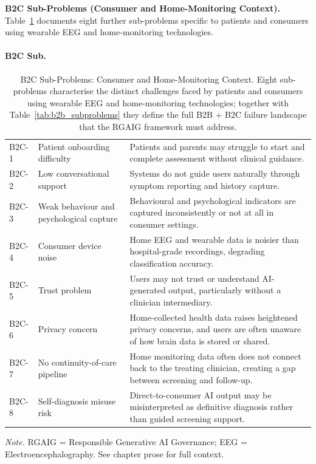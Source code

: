 \medskip
\noindent\textbf{B2C Sub-Problems (Consumer and Home-Monitoring Context).} Table~\ref{tab:b2c_subproblems} documents eight further sub-problems specific to patients and consumers using wearable EEG and home-monitoring technologies.

\paragraph{B2C Sub.}



{\tablestripes\tablefontsize
{}
\begin{xltabular}{\textwidth}{@{} >{\raggedright\arraybackslash}p{1.0cm} >{\raggedright\arraybackslash}p{4.4cm} p{8.9cm} @{}}
\caption[B2C Sub-Problems: Consumer and Home-Monitoring Context]{B2C Sub-Problems: Consumer and Home-Monitoring Context. Eight sub-problems characterise the distinct challenges faced by patients and consumers using wearable EEG and home-monitoring technologies; together with Table~\ref{tab:b2b_subproblems} they define the full B2B + B2C failure landscape that the RGAIG framework must address.}\label{tab:b2c_subproblems} \\
\toprule
\thead{\#} &  &  \\
\midrule
\endfirsthead
\endhead
\bottomrule
\endlastfoot
B2C-1 & Patient onboarding difficulty & Patients and parents may struggle to start and complete assessment without clinical guidance. \\
\addlinespace
B2C-2 & Low conversational support & Systems do not guide users naturally through symptom reporting and history capture. \\
\addlinespace
B2C-3 & Weak behaviour and psychological capture & Behavioural and psychological indicators are captured inconsistently or not at all in consumer settings. \\
\addlinespace
B2C-4 & Consumer device noise & Home EEG and wearable data is noisier than hospital-grade recordings, degrading classification accuracy. \\
\addlinespace
B2C-5 & Trust problem & Users may not trust or understand AI-generated output, particularly without a clinician intermediary. \\
\addlinespace
B2C-6 & Privacy concern & Home-collected health data raises heightened privacy concerns, and users are often unaware of how brain data is stored or shared. \\
\addlinespace
B2C-7 & No continuity-of-care pipeline & Home monitoring data often does not connect back to the treating clinician, creating a gap between screening and follow-up. \\
\addlinespace
B2C-8 & Self-diagnosis misuse risk & Direct-to-consumer AI output may be misinterpreted as definitive diagnosis rather than guided screening support. \\
\end{xltabular}}
\vspace{0.3em}\noindent\textit{Note.} RGAIG = Responsible Generative AI Governance; EEG = Electroencephalography. See chapter prose for full context.

